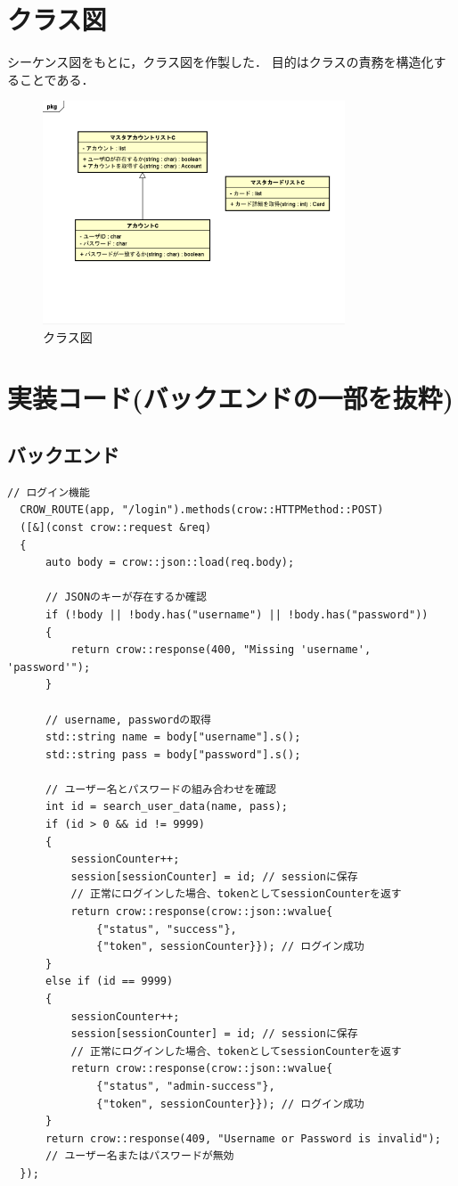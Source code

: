 \documentclass{ltjsarticle}
\begin{document}
\section{クラス図}
シーケンス図をもとに，クラス図を作製した．
目的はクラスの責務を構造化することである．
\begin{figure}[H]
    \centering
    \includegraphics[width=0.8\textwidth]{src/class.png}
    \caption{クラス図}
    \label{fig:class}
\end{figure}

\section{実装コード(バックエンドの一部を抜粋)}
\subsection{バックエンド}
\begin{lstlisting}[frame=single, lineskip=-5pt]
// ログイン機能 
  CROW_ROUTE(app, "/login").methods(crow::HTTPMethod::POST)
  ([&](const crow::request &req)
  {
      auto body = crow::json::load(req.body);

      // JSONのキーが存在するか確認
      if (!body || !body.has("username") || !body.has("password"))
      {
          return crow::response(400, "Missing 'username', 'password'");
      }

      // username, passwordの取得
      std::string name = body["username"].s();
      std::string pass = body["password"].s();

      // ユーザー名とパスワードの組み合わせを確認
      int id = search_user_data(name, pass);
      if (id > 0 && id != 9999)
      {
          sessionCounter++;
          session[sessionCounter] = id; // sessionに保存
          // 正常にログインした場合、tokenとしてsessionCounterを返す
          return crow::response(crow::json::wvalue{
              {"status", "success"},
              {"token", sessionCounter}}); // ログイン成功
      }
      else if (id == 9999)
      {
          sessionCounter++;
          session[sessionCounter] = id; // sessionに保存
          // 正常にログインした場合、tokenとしてsessionCounterを返す
          return crow::response(crow::json::wvalue{
              {"status", "admin-success"},
              {"token", sessionCounter}}); // ログイン成功
      }
      return crow::response(409, "Username or Password is invalid"); 
      // ユーザー名またはパスワードが無効
  });
\end{lstlisting}
\end{document}
